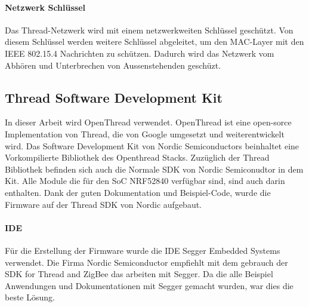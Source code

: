 \paragraph{Netzwerk Schlüssel}
Das Thread-Netzwerk wird mit einem netzwerkweiten Schlüssel geschützt. Von diesem Schlüssel werden weitere Schlüssel abgeleitet, um den MAC-Layer mit den IEEE 802.15.4 Nachrichten zu schützen. Dadurch wird das Netzwerk vom Abhören und Unterbrechen von Aussenstehenden geschüzt.\cite[Seite 1-5]{thread_group_inc_thread_2017}

\subsection{Thread Software Development Kit}\label{subsec:ThreadSoftwareDevelopmentKit}
In dieser Arbeit wird OpenThread verwendet. OpenThread ist eine open-sorce Implementation von Thread, die von Google umgesetzt und weiterentwickelt wird. Das Software Development Kit von Nordic Semiconductors beinhaltet eine Vorkompilierte Bibliothek des Openthread Stacks. Zuzüglich der Thread Bibliothek befinden sich auch die Normale SDK von Nordic Semiconudtor in dem Kit. Alle Module die für den SoC NRF52840 verfügbar sind, sind auch darin enthalten. Dank der guten Dokumentation und Beispiel-Code, wurde die Firmware auf der Thread SDK von Nordic aufgebaut. 

\paragraph{IDE}
Für die Erstellung der Firmware wurde die IDE Segger Embedded Systems verwendet. Die Firma Nordic Semiconductor empfiehlt mit dem gebrauch der SDK for Thread and ZigBee das arbeiten mit Segger. Da die alle Beispiel Anwendungen und Dokumentationen mit Segger gemacht wurden, war dies die beste Lösung.
